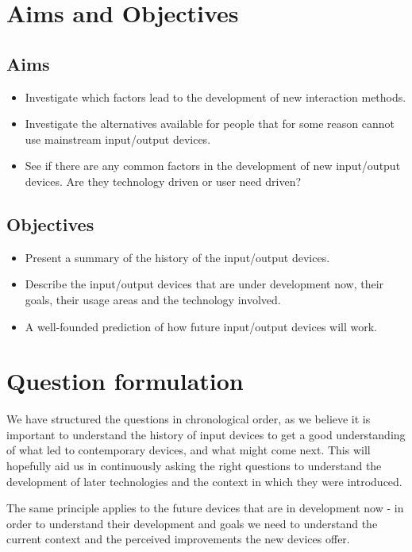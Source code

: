 \documentclass[a4paper,10pt]{article}
\begin{document}
\section{Aims and Objectives}
\subsection{Aims}
\begin{itemize}
\item
Investigate which factors lead to the development of new interaction methods.
\item
Investigate the alternatives available for people that for some reason cannot use mainstream input/output devices.
\item
See if there are any common factors in the development of new input/output devices. Are they technology driven or user need driven?
\end{itemize}
\subsection{Objectives}
\begin{itemize}
\item
Present a summary of the history of the input/output devices.
\item
Describe the input/output devices that are under development now, their goals, their usage areas and the technology involved.
\item
A well-founded prediction of how future input/output devices will work.

\end{itemize}


\section{Question formulation}	

We have structured the questions in chronological order, as we believe it is important to understand the history of input devices to get a good understanding of what led to contemporary devices, and what might come next. This will hopefully aid us in continuously asking the right questions to understand the development of later technologies and the context in which they were introduced.

The same principle applies to the future devices that are in development now - in order to understand their development and goals we need to understand the current context and the perceived improvements the new devices offer.
\end{document}
